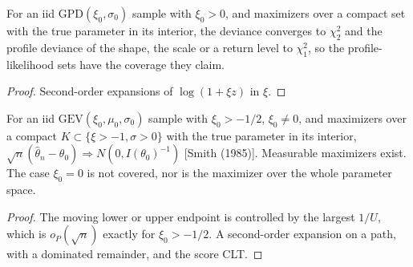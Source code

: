 \begin{theorem}
  \label{thm:gpd-wilks}
  \leanok
  For an iid $\mathrm{GPD}(\xi_0,\sigma_0)$ sample with $\xi_0 > 0$, and maximizers over a compact set with the true parameter in its interior, the deviance converges to $\chi^2_2$ and the profile deviance of the shape, the scale or a return level to $\chi^2_1$, so the profile-likelihood sets have the coverage they claim.
\end{theorem}
\begin{proof}
  \leanok
  Second-order expansions of $\log(1 + \xi z)$ in $\xi$.
\end{proof}

\begin{theorem}
  \label{thm:gev-mle-normality}
  \leanok
  For an iid $\mathrm{GEV}(\xi_0, \mu_0, \sigma_0)$ sample with $\xi_0 > -1/2$, $\xi_0 \ne 0$, and maximizers over a
  compact $K \subset \{\xi > -1, \sigma > 0\}$ with the true parameter in its interior,
  $\sqrt{n}(\hat\theta_n - \theta_0) \Rightarrow N(0, I(\theta_0)^{-1})$ [Smith (1985)]. Measurable maximizers
  exist. The case $\xi_0 = 0$ is not covered, nor is the maximizer over the whole parameter space.
\end{theorem}
\begin{proof}
  \leanok
  The moving lower or upper endpoint is controlled by the largest $1/U$, which is $o_P(\sqrt{n})$ exactly
  for $\xi_0 > -1/2$. A second-order expansion on a path, with a dominated remainder, and the score CLT.
\end{proof}


